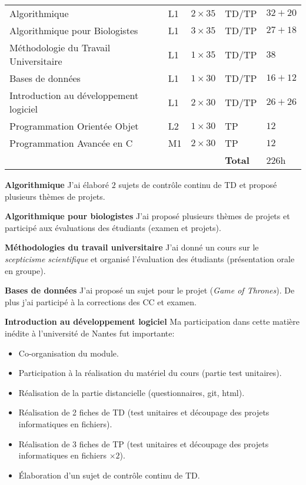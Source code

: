\begin{tabular}{m{6cm}||m{1.3cm}m{1.5cm}m{2cm}m{3cm}} 
\hline
Algorithmique                          & L1 & $2\times35$ & TD/TP & $32 + 20$ \\
Algorithmique pour Biologistes         & L1 & $3\times35$ & TD/TP & $27 + 18$ \\
Méthodologie du Travail Universitaire  & L1 & $1\times35$ & TD/TP & $38$ \\
Bases de données                       & L1 & $1\times30$ & TD/TP & $16 + 12$ \\ 
Introduction au développement logiciel & L1 & $2\times30$ & TD/TP & $26 + 26$ \\ 
Programmation Orientée Objet           & L2 & $1\times30$ & TP & $12$ \\
Programmation Avancée en C             & M1 & $2\times30$ & TP & $12$ \\
\cline{4-5}
                                       & & & {\bf Total} & $226$h \\
\hline
\end{tabular} 

{\bf Algorithmique} J'ai élaboré $2$ sujets de contrôle continu de TD et proposé plusieurs thèmes de projets.

{\bf Algorithmique pour biologistes} J'ai proposé plusieurs thèmes de projets et participé aux évaluations des étudiants (examen et projets).

{\bf Méthodologies du travail universitaire} J'ai donné un cours sur le {\it scepticisme scientifique} et organisé l'évaluation des étudiants (présentation orale en groupe). 

{\bf Bases de données} J'ai proposé un sujet pour le projet ({\it Game of Thrones}). De plus j'ai participé à la corrections des CC et examen.

{\bf Introduction au développement logiciel} Ma participation dans cette matière inédite à l'université de Nantes fut importante:

\begin{itemize}
\item Co-organisation du module.
\item Participation à la réalisation du matériel du cours (partie test unitaires).
\item Réalisation de la partie distancielle (questionnaires, git, html).
\item Réalisation de 2 fiches de TD (test unitaires et découpage des projets informatiques en fichiers).
\item Réalisation de 3 fiches de TP (test unitaires et découpage des projets informatiques en fichiers $\times 2$).
\item Élaboration d'un sujet de contrôle continu de TD.
\end{itemize}

